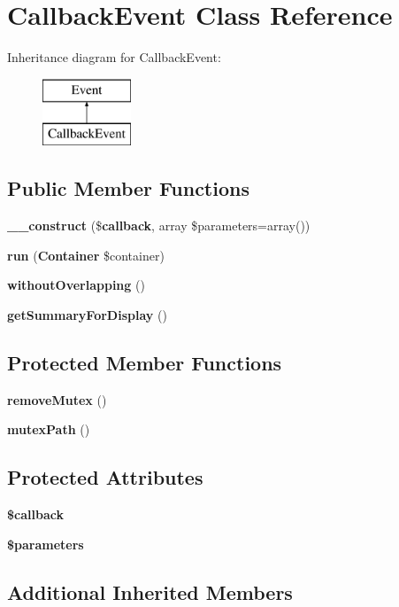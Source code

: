 \section{Callback\+Event Class Reference}
\label{class_illuminate_1_1_console_1_1_scheduling_1_1_callback_event}
Inheritance diagram for Callback\+Event\+:\begin{figure}[H]
\begin{center}
\leavevmode
\includegraphics[height=2.000000cm]{class_illuminate_1_1_console_1_1_scheduling_1_1_callback_event}
\end{center}
\end{figure}
\subsection*{Public Member Functions}
\begin{DoxyCompactItemize}
\item 
{\bf \+\_\+\+\_\+construct} (\${\bf callback}, array \$parameters=array())
\item 
{\bf run} ({\bf Container} \$container)
\item 
{\bf without\+Overlapping} ()
\item 
{\bf get\+Summary\+For\+Display} ()
\end{DoxyCompactItemize}
\subsection*{Protected Member Functions}
\begin{DoxyCompactItemize}
\item 
{\bf remove\+Mutex} ()
\item 
{\bf mutex\+Path} ()
\end{DoxyCompactItemize}
\subsection*{Protected Attributes}
\begin{DoxyCompactItemize}
\item 
{\bf \$callback}
\item 
{\bf \$parameters}
\end{DoxyCompactItemize}
\subsection*{Additional Inherited Members}


